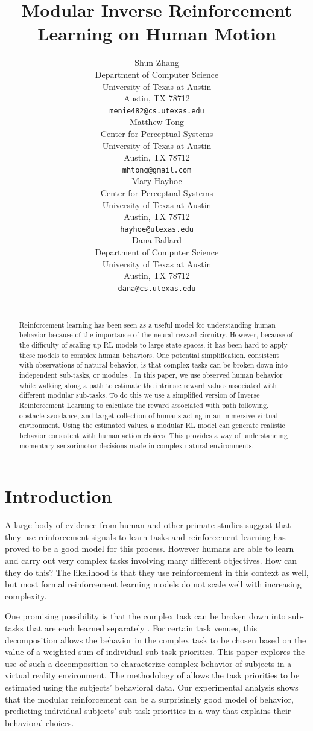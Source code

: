 \documentclass[11pt]{article} %
\title{Modular Inverse Reinforcement Learning on Human Motion}
\author{
Shun Zhang\\
Department of Computer Science\\
University of Texas at Austin\\
Austin, TX 78712 \\
\texttt{menie482@cs.utexas.edu} \\
\And
Matthew Tong \\
Center for Perceptual Systems\\
University of Texas at Austin\\
Austin, TX 78712 \\
\texttt{mhtong@gmail.com} \\
\AND
Mary Hayhoe \\
Center for Perceptual Systems\\
University of Texas at Austin\\
Austin, TX 78712 \\
\texttt{hayhoe@utexas.edu} \\
\And
Dana Ballard \\
Department of Computer Science\\
University of Texas at Austin\\
Austin, TX 78712 \\
\texttt{dana@cs.utexas.edu} \\
\\
}
\begin{document}
\maketitle

\begin{abstract}
Reinforcement learning has been seen as a useful model for understanding human
behavior because of the importance of the neural reward circuitry. However,
because of the difficulty of scaling up RL models to large state spaces, it has
been hard to apply these models to complex human behaviors. One potential
simplification, consistent with observations of natural behavior, is that
complex tasks can be broken down into independent sub-tasks, or modules . In
this paper, we use observed human behavior while walking along a path to
estimate the intrinsic reward values associated with different modular
sub-tasks. To do this we use a simplified version of Inverse Reinforcement
Learning to calculate the reward associated with path following, obstacle
avoidance, and target collection of humans acting in an immersive virtual
environment. Using the estimated values, a modular RL model can generate
realistic behavior consistent with human action choices. This provides a way of
understanding momentary sensorimotor decisions made in complex natural
environments.
\end{abstract}


\startmain %

\section{Introduction}

A large body of evidence from human and other primate studies 
suggest that they use reinforcement signals to learn tasks and reinforcement 
learning has proved to be a good model for this process.
However humans are able to learn and carry out very complex tasks involving 
many different objectives. 
How can they do this? The likelihood is that they use reinforcement in this 
context as well, but most formal reinforcement learning models do not scale 
well with increasing complexity.

One promising possibility is that the complex task can be broken down into 
sub-tasks that are each learned separately \cite{sprague2003multiple,
rothkopf2013modular, dietterich2000hierarchical}. 
For certain task venues, this decomposition allows the behavior in the complex 
task to be chosen based on the value of a weighted sum of individual sub-task priorities.
This paper explores the use of such a decomposition to characterize complex
behavior of subjects in a virtual reality environment. The methodology of
\cite{rothkopf2013modular} allows the task priorities to be estimated using the
subjects' behavioral data. Our experimental analysis shows that the modular reinforcement can be a 
surprisingly good model of behavior, predicting individual subjects' sub-task 
priorities in a way that explains their behavioral choices.
\end{document}
